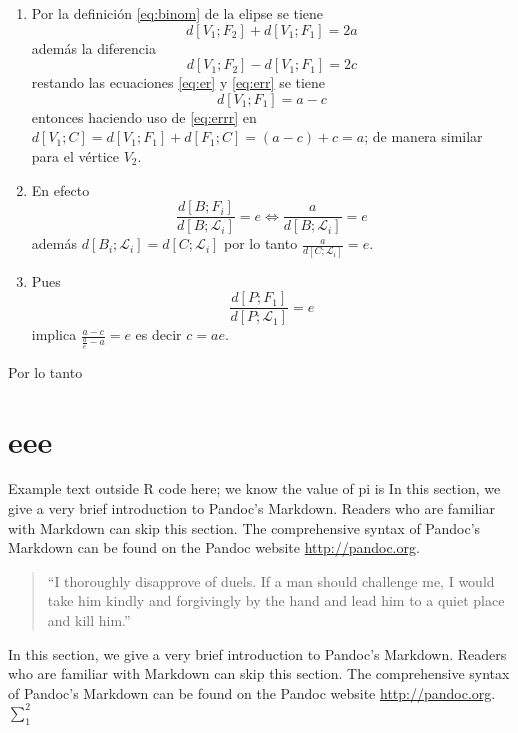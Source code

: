 \documentclass[10pt,]{krantz}
\theoremstyle{definition}
\theoremstyle{definition}
\theoremstyle{definition}
\theoremstyle{remark}
\begin{document}
\begin{enumerate}
\def\labelenumi{\arabic{enumi}.}
\setcounter{enumi}{1}
\item
  Por la definición \eqref{eq:binom} de la elipse se tiene
  \begin{equation}
  d\left[V_1;F_2\right]+d\left[V_1;F_1\right]=2a
  \label{eq:er}
  \end{equation}
  además la diferencia
  \begin{equation}
  d\left[V_1;F_2\right]-d\left[V_1;F_1\right]=2c
  \label{eq:err}
  \end{equation}
  restando las ecuaciones \eqref{eq:er} y \eqref{eq:err} se tiene
  \begin{equation}
  d\left[V_1;F_1\right]=a-c
  \label{eq:errr}
  \end{equation}
  entonces haciendo uso de \eqref{eq:errr} en \(d\left[V_1;C\right]=d\left[V_1;F_1\right]+d\left[F_1;C\right]=(a-c)+c=a\); de manera similar para el vértice \(V_2\).
\item
  En efecto \[\frac{d\left[B;F_i\right]}{d\left[B;\mathcal{L}_i\right]}=e\Longleftrightarrow \frac{a}{d\left[B;\mathcal{L}_i\right]}=e\] además \(d\left[B_i;\mathcal{L}_i\right]=d\left[C;\mathcal{L}_i\right]\) por lo tanto \(\frac{a}{d\left[C;\mathcal{L}_i\right]}=e\).
\item
  Pues \[\frac{d\left[P;F_1\right]}{d\left[P;\mathcal{L}_1\right]}=e\] implica \(\frac{a-c}{\frac{a}{e}-a}=e\) es decir \(c=ae\).
\end{enumerate}

Por lo tanto

\hypertarget{eee}{%
\chapter{eee}\label{eee}}

Example text outside R code here; we know the value of
pi is In this section, we give a very brief introduction to Pandoc's Markdown. Readers who are familiar with Markdown can skip this section. The comprehensive syntax of Pandoc's Markdown can be found on the Pandoc website \url{http://pandoc.org}.

\begin{quote}
``I thoroughly disapprove of duels. If a man should challenge me,
I would take him kindly and forgivingly by the hand and lead him
to a quiet place and kill him.''
\end{quote}

In this section, we give a very brief introduction to Pandoc's Markdown. Readers who are familiar with Markdown can skip this section. The comprehensive syntax of Pandoc's Markdown can be found on the Pandoc website \url{http://pandoc.org}. \(\sum_1^2\)
\end{document}
